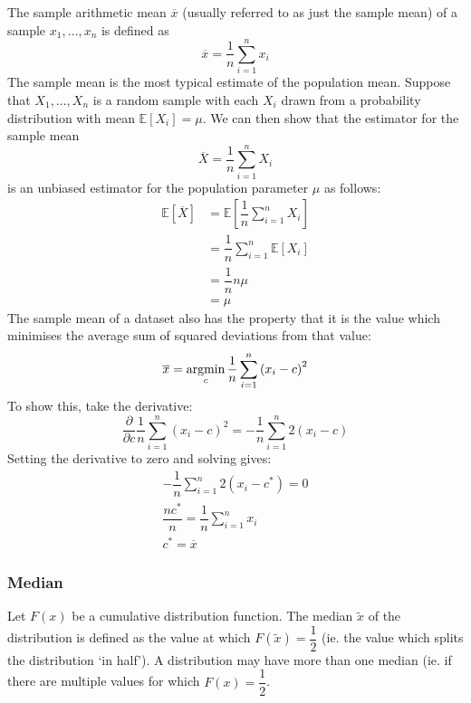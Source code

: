 \documentclass[11pt]{report} %
\begin{document}
The sample arithmetic mean $\overline{x}$ (usually referred to as just the sample mean) of a sample $x_{1}, \dots, x_{n}$ is defined as
\begin{equation}
\overline{x} = \dfrac{1}{n}\sum_{i = 1}^{n}x_{i}
\end{equation}
The sample mean is the most typical estimate of the population mean. Suppose that $X_{1}, \dots, X_{n}$ is a random sample with each $X_{i}$ drawn from a probability distribution with mean $\mathbb{E}\left[X_{i}\right] = \mu$. We can then show that the estimator for the sample mean
\begin{equation}
\overline{X} = \dfrac{1}{n}\sum_{i = 1}^{n}X_{i}
\end{equation}
is an unbiased estimator for the population parameter $\mu$ as follows:
\begin{align}
\mathbb{E}\left[\overline{X}\right] &= \mathbb{E}\left[\dfrac{1}{n}\sum_{i = 1}^{n}X_{i}\right] \\
&= \dfrac{1}{n}\sum_{i = 1}^{n}\mathbb{E}\left[X_{i}\right] \\
&= \dfrac{1}{n}n\mu \\
&= \mu
\end{align}
The sample mean of a dataset also has the property that it is the value which minimises the average sum of squared deviations from that value:
\begin{equation}
\overline{x} = \operatorname*{argmin}_{c}\dfrac{1}{n}\sum_{i = 1}^{n}\left(x_{i} - c\right)^{2}
\end{equation}
To show this, take the derivative:
\begin{equation}
\dfrac{\partial}{\partial c}\dfrac{1}{n}\sum_{i = 1}^{n}\left(x_{i} - c\right)^{2} = -\dfrac{1}{n}\sum_{i = 1}^{n}2\left(x_{i} - c\right)
\end{equation}
Setting the derivative to zero and solving gives:
\begin{gather}
-\dfrac{1}{n}\sum_{i = 1}^{n}2\left(x_{i} - c^{*}\right) = 0 \\
\dfrac{nc^{*}}{n} = \dfrac{1}{n}\sum_{i = 1}^{n}x_{i} \\
c^{*} = \overline{x}
\end{gather}

\subsubsection{Median}

Let $F\left(x\right)$ be a cumulative distribution function. The median $\widetilde{x}$ of the distribution is defined as the value at which $F\left(\widetilde{x}\right) = \dfrac{1}{2}$ (ie. the value which splits the distribution `in half'). A distribution may have more than one median (ie. if there are multiple values for which $F\left(x\right) = \dfrac{1}{2}$.
\end{document}
